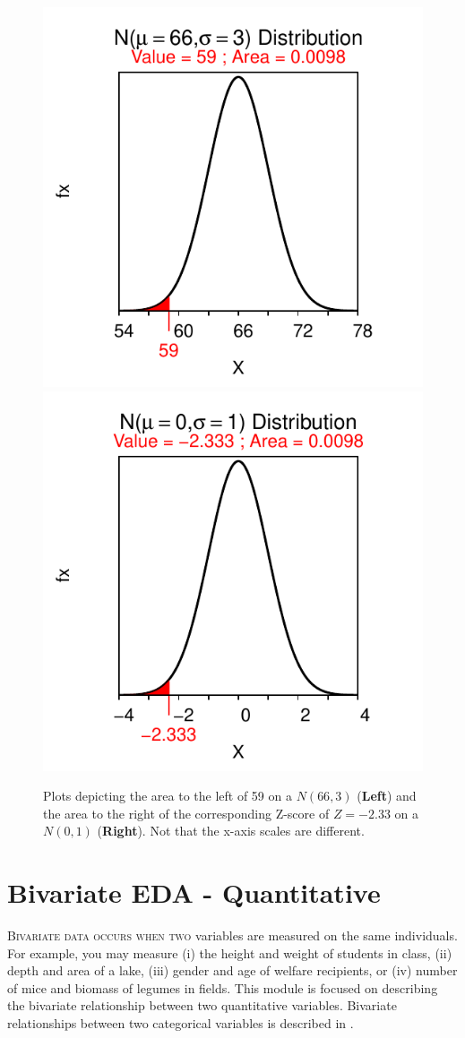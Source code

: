 \documentclass[10pt,openany]{book}\usepackage[]{graphicx}\usepackage[]{color}
\newenvironment{knitrout}{}{} %
\begin{document}
\begin{knitrout}
\color{fgcolor}\begin{figure}[hbtp]

{\centering \includegraphics[width=.4\linewidth]{Figs/NormStandardizingEx-1} 
\includegraphics[width=.4\linewidth]{Figs/NormStandardizingEx-2} 

}

\caption{Plots depicting the area to the left of 59 on a $N(66,3)$ (\textbf{Left}) and the area to the right of the corresponding Z-score of $Z=-2.33$ on a $N(0,1)$ (\textbf{Right}). Not that the x-axis scales are different.}\label{fig:NormStandardizingEx}
\end{figure}


\end{knitrout}



\chapter{Bivariate EDA - Quantitative} \label{chap:BivEDAQuant}

\vspace{-30pt}
\minitoc
\vspace{18pt}

\lettrine{B}{ivariate data occurs when two} variables are measured on the same individuals. For example, you may measure (i) the height and weight of students in class, (ii) depth and area of a lake, (iii) gender and age of welfare recipients, or (iv) number of mice and biomass of legumes in fields. This module is focused on describing the bivariate relationship between two quantitative variables. Bivariate relationships between two categorical variables is described in .
\end{document}
